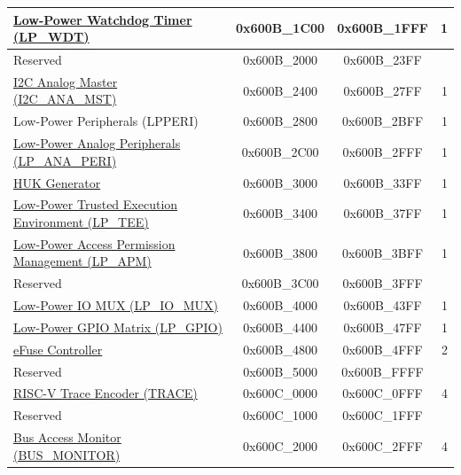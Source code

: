 \begin{ThreePartTable}
\begin{longtable}[c]{ |p{7cm}|c|c|r| }
    \hyperref[mod:wdt]{Low-Power Watchdog Timer (LP\_WDT)}                     & 0x600B\_1C00 & 0x600B\_1FFF &   1     \\\hline
        \rowcolor{gray!25}  Reserved                    & 0x600B\_2000 & 0x600B\_23FF &         \\\hline
    \hyperref[mod:lowpowm]{I2C Analog Master (I2C\_ANA\_MST)}          
    & 0x600B\_2400 & 0x600B\_27FF &   1     \\\hline
    Low-Power Peripherals (LPPERI)                      & 0x600B\_2800 & 0x600B\_2BFF &   1     \\\hline
    \hyperref[mod:lowpowm]{Low-Power Analog Peripherals (LP\_ANA\_PERI)}               & 0x600B\_2C00 & 0x600B\_2FFF &   1     \\\hline
    \hyperref[mod:keymng]{HUK Generator}                    & 0x600B\_3000 & 0x600B\_33FF &   1    \\\hline
    \hyperref[mod:permctrl]{Low-Power Trusted Execution Environment (LP\_TEE)} \tnote{\textcolor{red}{2}}                     & 0x600B\_3400 & 0x600B\_37FF &   1    \\\hline
    \hyperref[mod:permctrl]{Low-Power Access Permission Management (LP\_APM)} \tnote{\textcolor{red}{2}}                     & 0x600B\_3800 & 0x600B\_3BFF &   1     \\\hline
        \rowcolor{gray!25}  Reserved                    & 0x600B\_3C00 & 0x600B\_3FFF &         \\\hline
    \hyperref[mod:iomuxgpio]{Low-Power IO MUX (LP\_IO\_MUX)}                     & 0x600B\_4000 & 0x600B\_43FF &   1     \\\hline
    \hyperref[mod:iomuxgpio]{Low-Power GPIO Matrix (LP\_GPIO)}                     & 0x600B\_4400 & 0x600B\_47FF &   1     \\\hline
    \hyperref[mod:efuse]{eFuse Controller}                       & 0x600B\_4800 & 0x600B\_4FFF &   2     \\\hline
        \rowcolor{gray!25}  Reserved                    & 0x600B\_5000 & 0x600B\_FFFF &         \\\hline
    \hyperref[mod:riscvtracenc]{RISC-V Trace Encoder (TRACE)}                       & 0x600C\_0000 & 0x600C\_0FFF &   4     \\\hline
        \rowcolor{gray!25}  Reserved                    & 0x600C\_1000 & 0x600C\_1FFF &         \\\hline
    \hyperref[mod:dbgassist]{Bus Access Monitor (BUS\_MONITOR) \tnote{\textcolor{red}{2}}}               & 0x600C\_2000 & 0x600C\_2FFF &   4     \\\hline

\end{longtable}
\end{ThreePartTable}
